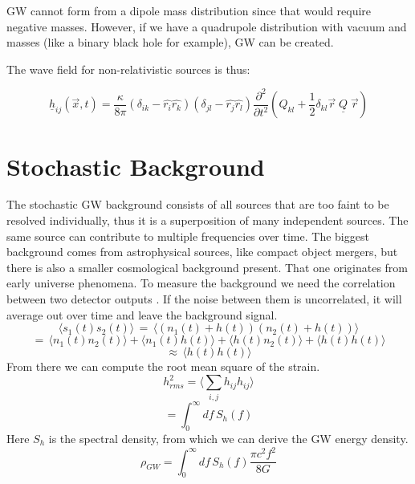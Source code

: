 GW cannot form from a dipole mass distribution since that would require negative masses. However, if we have a quadrupole distribution with vacuum and masses (like a binary black hole for example), GW can be created.

The wave field for non-relativistic sources is thus:

\begin{equation}
    \underline{h}_{ij}(\vec{x}, t)=\frac{\kappa}{8\pi}(\delta_{ik}-\hat{r_i}\hat{r_k})(\delta_{jl}-\hat{r_j}\hat{r_l})\frac{\partial^2}{\partial t^2}\left(Q_{kl}+\frac{1}{2}\delta_{kl}\vec{r}\; \underline{Q} \; \vec{r}\right)
\end{equation}

\section{Stochastic Background}
The stochastic GW background consists of all sources that are too faint to be resolved individually, thus it is a superposition of many independent sources. The same source can contribute to multiple frequencies over time. 
The biggest background comes from astrophysical sources, like compact object mergers, but there is also a smaller cosmological background present. That one originates from early universe phenomena. 
To measure the background we need the correlation between two detector
outputs \cite{christensen_stochastic_2019}. If the noise between them is uncorrelated, it will average out over time and leave the background signal.
\begin{equation}
    \langle s_1 (t) s_2(t)\rangle \, = \, \langle(n_1(t) + h(t))(n_2(t) + h(t))\rangle
\end{equation}
\begin{equation}
    = \, \langle n_1(t) n_2(t)\rangle + \langle n_1(t)h(t)\rangle + \langle h(t)n_2(t)\rangle  + \langle h(t)h(t)\rangle  
\end{equation}
\begin{equation}
    \approx \, \langle h(t)h(t)\rangle 
\end{equation}
From there we can compute the root mean square of the strain.
\begin{equation}
    h_{rms}^2 = \langle \sum_{i,j} h_{ij} h_{ij}\rangle 
\end{equation}
\begin{equation}
    = \int_0^\infty df \, S_h (f)
\end{equation}
Here $S_h$ is the spectral density, from which we can derive the GW energy
density.
\begin{equation}
    \rho_{GW} = \int_0^\infty df \, S_h(f) \frac{\pi c^2 f^2}{8G}
\end{equation} 

